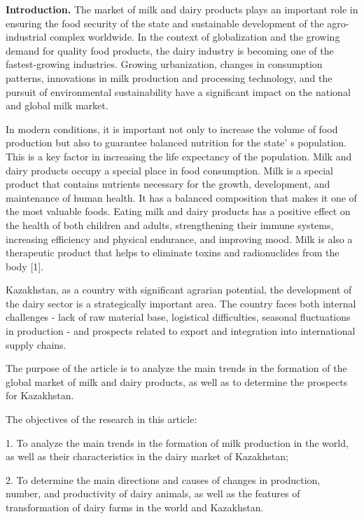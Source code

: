 \begin{multicols}{2}
{\bfseries Introduction.} The market of milk and dairy products plays an
important role in ensuring the food security of the state and
sustainable development of the agro-industrial complex worldwide. In the
context of globalization and the growing demand for quality food
products, the dairy industry is becoming one of the fastest-growing
industries. Growing urbanization, changes in consumption patterns,
innovations in milk production and processing technology, and the
pursuit of environmental sustainability have a significant impact on the
national and global milk market.

In modern conditions, it is important not only to increase the volume of
food production but also to guarantee balanced nutrition for the
state' s population. This is a key factor in increasing
the life expectancy of the population. Milk and dairy products occupy a
special place in food consumption. Milk is a special product that
contains nutrients necessary for the growth, development, and
maintenance of human health. It has a balanced composition that makes it
one of the most valuable foods. Eating milk and dairy products has a
positive effect on the health of both children and adults, strengthening
their immune systems, increasing efficiency and physical endurance, and
improving mood. Milk is also a therapeutic product that helps to
eliminate toxins and radionuclides from the body {[}1{]}.

Kazakhstan, as a country with significant agrarian potential, the
development of the dairy sector is a strategically important area. The
country faces both internal challenges - lack of raw material base,
logistical difficulties, seasonal fluctuations in production - and
prospects related to export and integration into international supply
chains.

The purpose of the article is to analyze the main trends in the
formation of the global market of milk and dairy products, as well as to
determine the prospects for Kazakhstan.

The objectives of the research in this article:

1. To analyze the main trends in the formation of milk production in the
world, as well as their characteristics in the dairy market of
Kazakhstan;

2. To determine the main directions and causes of changes in production,
number, and productivity of dairy animals, as well as the features of
transformation of dairy farms in the world and Kazakhstan.


\end{multicols}
